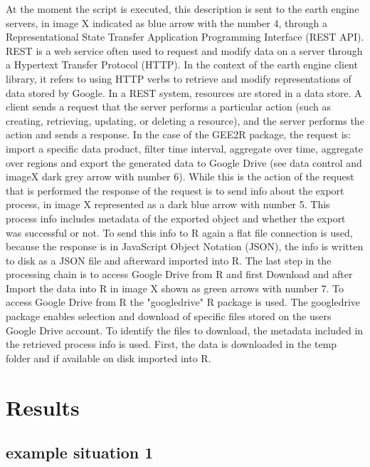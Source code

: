 \documentclass[12pt,twoside,a4paper,final]{report}
\begin{document}
At the moment the script is executed, this description is sent to the earth engine servers, in image X indicated as blue arrow with the number 4, through a Representational State Transfer Application Programming Interface (REST API). REST is a web service often used to request and modify data on a server through a Hypertext Transfer Protocol (HTTP).
In the context of the earth engine client library, it refers to using HTTP verbs to retrieve and modify representations of data stored by Google.
In a REST system, resources are stored in a data store. A client sends a request that the server performs a particular action (such as creating, retrieving, updating, or deleting a resource), and the server performs the action and sends a response. In the case of the GEE2R package, the request is: import a specific data product, filter time interval, aggregate over time, aggregate over regions and export the generated data to Google Drive (see data control and imageX dark grey arrow with number 6). While this is the action of the request that is performed the response of the request is to send info about the export process, in image X represented as a dark blue arrow with number 5. This process info includes metadata of the exported object and whether the export was successful or not. To send this info to R again a flat file connection is used, because the response is in JavaScript Object Notation (JSON), the info is written to disk as a JSON file and afterward imported into R. The last step in the processing chain is to access Google Drive from R and first Download and after Import the data into R in image X shown as green arrows with number 7. To access Google Drive from R the "googledrive" R package is used. The googledrive package enables selection and download of specific files stored on the users Google Drive account. To identify the files to download, the metadata included in the retrieved process info is used. First, the data is downloaded in the temp folder and if available on disk imported into R.


\chapter{Results}

\section{example situation 1}
\end{document}
